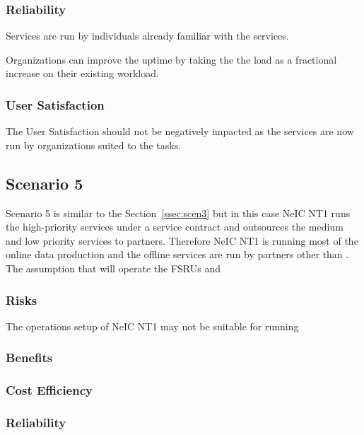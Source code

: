 \documentclass[12pt,a4paper]{article}
\begin{document}
\subsubsection*{Reliability}
\bitm
\item Services are run by individuals already familiar with the services.
\item Organizations can improve the uptime by taking the the \ED load as a fractional increase on their existing workload.
\eitm

\subsubsection*{User Satisfaction}
\bitm
\item The User Satisfaction should not be negatively impacted as the services are now run by organizations suited to the tasks.
\eitm
  
\subsection{Scenario 5}
\label{ssec:scen5}

Scenario 5 is similar to the Section~\ref{ssec:scen3} but in this case
NeIC NT1 runs the high-priority services under a service contract and \EC outsources the medium and low priority services to partners.
Therefore NeIC NT1 is running most of the online data production and the offline services are run by partners other than \EC.
The assumption that \EC will operate the FSRUs and 

\subsubsection*{Risks}
\bitm
\item The operations setup of NeIC NT1 may not be suitable for running
\eitm

\subsubsection*{Benefits}
\bitm
\item 
\eitm

\subsubsection*{Cost Efficiency}
\bitm
\item 
\eitm

\subsubsection*{Reliability}
\bitm
\item 
\eitm
\end{document}
